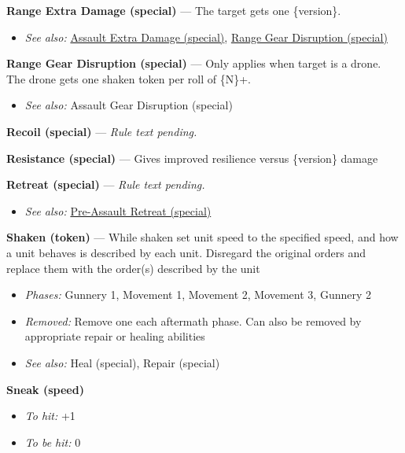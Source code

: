 \documentclass[a4paper,12pt]{article}
\begin{document}
\label{rule-special-range-extra-damage}%
\noindent\textbf{Range Extra Damage (special)} --- The target gets one \{version\}.
\begin{itemize}
\item \textit{See also:} \hyperref[rule-special-assault-extra-damage]{Assault Extra Damage (special)}, \hyperref[rule-special-range-gear-disruption]{Range Gear Disruption (special)}
\end{itemize}


\label{rule-special-range-gear-disruption}%
\noindent\textbf{Range Gear Disruption (special)} --- Only applies when target is a drone. The drone gets one shaken token per roll of \{N\}+.
\begin{itemize}
\item \textit{See also:} Assault Gear Disruption (special)
\end{itemize}


\label{rule-special-recoil}%
\noindent\textbf{Recoil (special)} --- \textit{Rule text pending.}

\label{rule-special-resistance}%
\noindent\textbf{Resistance (special)} --- Gives improved resilience versus \{version\} damage


\label{rule-special-retreat}%
\noindent\textbf{Retreat (special)} --- \textit{Rule text pending.}\begin{itemize}
\item \textit{See also:} \hyperref[rule-special-pre-assault-retreat]{Pre-Assault Retreat (special)}
\end{itemize}


\label{rule-token-shaken}%
\noindent\textbf{Shaken (token)} --- While shaken set unit speed to the specified speed, and how a unit behaves is described by each unit. Disregard the original orders and replace them with the order(s) described by the unit
\begin{itemize}
\item \textit{Phases:} Gunnery 1, Movement 1, Movement 2, Movement 3, Gunnery 2
\item \textit{Removed:} Remove one each aftermath phase. Can also be removed by appropriate repair or healing abilities
\item \textit{See also:} Heal (special), Repair (special)
\end{itemize}


\label{rule-speed-sneak}%
\noindent\textbf{Sneak (speed)}\begin{itemize}
\item \textit{To hit:} +1
\item \textit{To be hit:} 0
\end{itemize}
\end{document}
